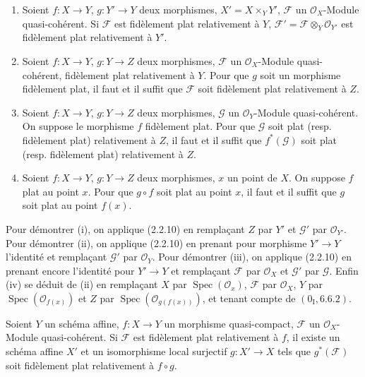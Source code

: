 \begin{corollary}[2.2.11]
\label{IV.2.2.11-fr}
\begin{enumerate}
\item[(i)] Soient $f:X\to Y$, $g:Y'\to Y$ deux morphismes,
$X'=X\times_Y Y'$, $\mathscr F$ un $\mathcal O_X$-Module quasi-cohérent. Si
$\mathscr F$ est fidèlement plat relativement à $Y$,
$\mathscr F'=\mathscr F\otimes_Y\mathcal O_{Y'}$ est fidèlement plat
relativement à $Y'$.
\item[(ii)] Soient $f:X\to Y$, $g:Y\to Z$ deux morphismes, $\mathscr F$ un
$\mathcal O_X$-Module quasi-cohérent, fidèlement plat relativement à $Y$.
Pour que $g$ soit un morphisme fidèlement plat, il faut et il suffit que
$\mathscr F$ soit fidèlement plat relativement à $Z$.
\item[(iii)] Soient $f:X\to Y$, $g:Y\to Z$ deux morphismes, $\mathscr G$ un
$\mathcal O_Y$-Module quasi-cohérent. On suppose le morphisme $f$ fidèlement
plat. Pour que $\mathscr G$ soit plat (resp. fidèlement plat) relativement à
$Z$, il faut et il suffit que $f^*(\mathscr G)$ soit plat (resp. fidèlement
plat) relativement à $Z$.
\item[(iv)] Soient $f:X\to Y$, $g:Y\to Z$ deux morphismes, $x$ un point de
$X$. On suppose $f$ plat au point $x$. Pour que $g\circ f$ soit plat au point
$x$, il faut et il suffit que $g$ soit plat au point $f(x)$.
\end{enumerate}
\end{corollary}

Pour démontrer (i), on applique (2.2.10) en remplaçant $Z$ par $Y'$ et
$\mathscr G'$ par $\mathcal O_{Y'}$. Pour démontrer (ii), on applique
(2.2.10) en prenant pour morphisme $Y'\to Y$ l'identité et remplaçant
$\mathscr G'$ par $\mathcal O_Y$. Pour démontrer (iii), on applique (2.2.10)
en prenant encore l'identité pour $Y'\to Y$ et remplaçant $\mathscr F$ par
$\mathcal O_X$ et $\mathscr G'$ par $\mathscr G$. Enfin (iv) se déduit de
(ii) en remplaçant $X$ par $\operatorname{Spec}(\mathcal O_x)$,
$\mathscr F$ par $\mathcal O_X$, $Y$ par
$\operatorname{Spec}(\mathcal O_{f(x)})$ et $Z$ par
$\operatorname{Spec}(\mathcal O_{g(f(x))})$, et tenant compte de
$(0_{\mathrm I},6.6.2)$.

\begin{corollary}[2.2.12]
\label{IV.2.2.12-fr}
Soient $Y$ un schéma affine, $f:X\to Y$ un morphisme quasi-compact,
$\mathscr F$ un $\mathcal O_X$-Module quasi-cohérent. Si $\mathscr F$ est
fidèlement plat relativement à $f$, il existe un schéma affine $X'$ et un
isomorphisme local surjectif $g:X'\to X$ tels que $g^*(\mathscr F)$ soit
fidèlement plat relativement à $f\circ g$.
\end{corollary}

